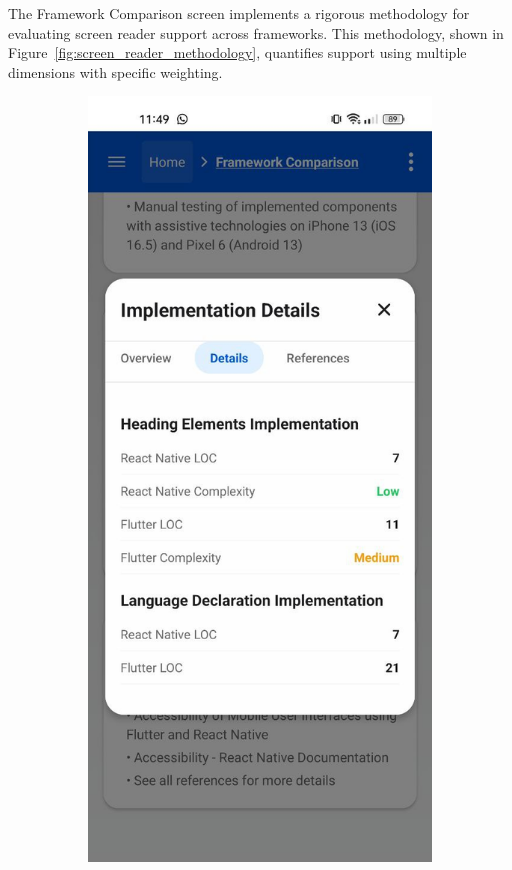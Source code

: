 The Framework Comparison screen implements a rigorous methodology for evaluating screen reader support across frameworks. This methodology, shown in Figure~\ref{fig:screen_reader_methodology}, quantifies support using multiple dimensions with specific weighting.

\begin{figure}[ht]
    \centering
    \begin{subfigure}[b]{0.48\textwidth}
        \centering
        \includegraphics[width=\linewidth, alt={Screen reader support comparison methodology}]{img/methodology-details.jpg}

\end{subfigure}
\end{figure}
